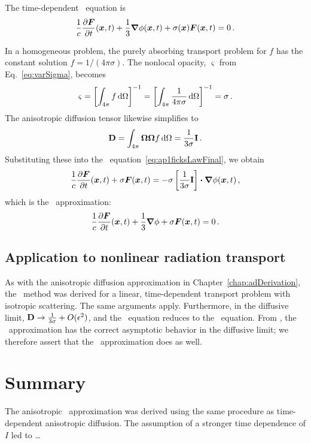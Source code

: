 The time-dependent \Pone\ equation is
\begin{equation*}
  \frac{1}{c}\frac{\partial \bm{F}}{\partial t}(\bm{x},t)
  + \frac{1}{3} \bm{\nabla} \phi(\bm{x}, t)
  + \sigma(\bm{x})\bm{F}(\bm{x},t) 
  = 0 \,.
\end{equation*}

In a homogeneous problem, the purely absorbing transport problem for $f$ has the
constant solution $f=1/(4\pi\sigma)$. The nonlocal opacity, $\varsigma$ from
Eq.~\eqref{eq:varSigma}, becomes
\begin{equation*}
  \varsigma
  = \left[ \int_{4\pi} f \mathop{}\!\mathrm{d} \Omega \right]^{-1}
  = \left[ \int_{4\pi} \frac{1}{4\pi\sigma} \mathop{}\!\mathrm{d} \Omega \right]^{-1}
  = \sigma \,.
\end{equation*}
The anisotropic diffusion tensor likewise simplifies to
\begin{equation*}
  \mathbf{D} = \int_{4\pi} \bm{\Omega}\bm{\Omega} f \mathop{}\!\mathrm{d} \Omega =
  \frac{1}{3\sigma}\mathbf{I} \,.
\end{equation*}
Substituting these into the \APone\ equation~\eqref{eq:ap1ficksLawFinal}, we obtain
\begin{equation*}
  \frac{1}{c}\frac{\partial \bm{F}}{\partial t}(\bm{x},t) + \sigma\bm{F}(\bm{x},t) 
  = - \sigma \left[ \frac{1}{3\sigma}\mathbf{I} \right]
  \bm{\cdot} \bm{\nabla} \phi(\bm{x}, t) \,,
\end{equation*}
which is the \Pone\ approximation:
\begin{equation*}
  \frac{1}{c}\frac{\partial \bm{F}}{\partial t}(\bm{x},t) + \frac{1}{3} \bm{\nabla} \phi
  + \sigma\bm{F}(\bm{x},t) 
  = 0\,.
\end{equation*}

\subsection{Application to nonlinear radiation transport}

As with the anisotropic diffusion approximation in
Chapter~\ref{chap:adDerivation}, the \APone\ method was derived for a linear,
time-dependent transport problem with isotropic scattering. The same arguments
apply. Furthermore, in the diffusive limit, $\mathbf{D} \to \frac{1}{3\sigma} +
O(\epsilon^2)$, and the \APone\ equation reduces to the \Pone\ equation. From
\cite{Mor2000}, the \Pone\ approximation has the correct asymptotic behavior in
the diffusive limit; we therefore assert that the \APone\ approximation does
as well. 


\section{Summary}
The anisotropic \Pone\ approximation was derived using the same procedure as 
time-dependent anisotropic diffusion. The assumption of a stronger time
dependence of $I$ led to \dots

